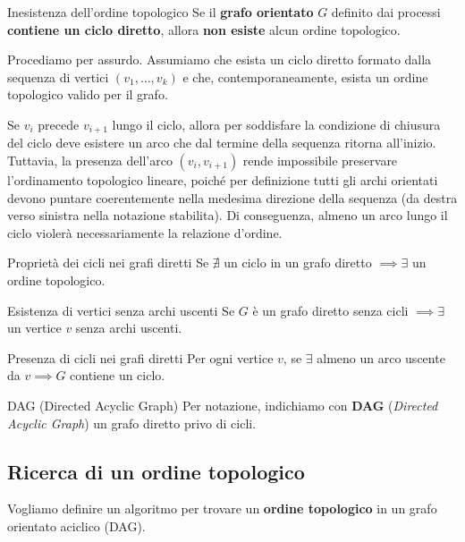 \documentclass[12pt]{report}
\begin{document}
	\begin{proposizione}{Inesistenza dell'ordine topologico}{}
		Se il \textbf{grafo orientato} $G$ definito dai processi \textbf{contiene un ciclo diretto}, allora \textbf{non esiste} alcun ordine topologico.
	\end{proposizione}
	
	\begin{dimostrazione}{}{}
		Procediamo per assurdo. Assumiamo che esista un ciclo diretto formato dalla sequenza di vertici $(v_1, \dots, v_k)$ e che, contemporaneamente, esista un ordine topologico valido per il grafo.
		
		Se $v_i$ precede $v_{i+1}$ lungo il ciclo, allora per soddisfare la condizione di chiusura del ciclo deve esistere un arco che dal termine della sequenza ritorna all'inizio. Tuttavia, la presenza dell'arco $(v_i, v_{i+1})$ rende impossibile preservare l'ordinamento topologico lineare, poiché per definizione tutti gli archi orientati devono puntare coerentemente nella medesima direzione della sequenza (da destra verso sinistra nella notazione stabilita). Di conseguenza, almeno un arco lungo il ciclo violerà necessariamente la relazione d'ordine.
	\end{dimostrazione}
	
	\begin{proposizione}{Proprietà dei cicli nei grafi diretti}{}
		Se $\nexists$ un ciclo in un grafo diretto $\implies \exists$ un ordine topologico.
	\end{proposizione}
	
	\begin{proposizione}{Esistenza di vertici senza archi uscenti}{}
		Se $G$ è un grafo diretto senza cicli $\implies \exists$ un vertice $v$ senza archi uscenti.
	\end{proposizione}
	
	\begin{proposizione}{Presenza di cicli nei grafi diretti}{}
		Per ogni vertice $v$, se $\exists$ almeno un arco uscente da $v \implies G$ contiene un ciclo.
	\end{proposizione}
	
	\begin{definizione}{DAG (Directed Acyclic Graph)}{}
		Per notazione, indichiamo con \textbf{DAG} (\textit{Directed Acyclic Graph}) un grafo diretto privo di cicli.
	\end{definizione}
	
	\subsection{Ricerca di un ordine topologico}
	Vogliamo definire un algoritmo per trovare un \textbf{ordine topologico} in un grafo orientato aciclico (DAG).
	
\end{document}
